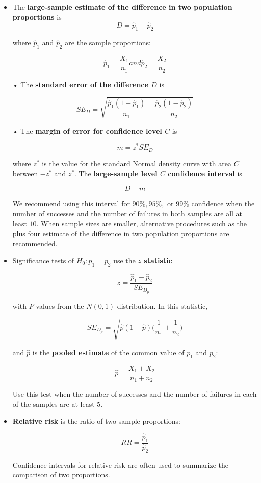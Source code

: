 		\begin{itemize}
			\item The \textbf{large-sample estimate of the difference in two population proportions} is
			\[D=\hat{p}_1-\hat{p}_2\]
			
			where $\hat{p}_1$ and $\hat{p}_2$ are the sample proportions:
			
			\[\hat{p}_1=\frac{X_1}{n_1} and \hat{p}_2=\frac{X_2}{n_2}\]
			
			• The \textbf{standard error of the difference $D$} is
			
			\[SE_D=    \sqrt{\frac{\hat{p}_1(1-\hat{p}_1)}{n_1}+\frac{\hat{p}_2(1-\hat{p}_2)}{n_2}}\]
			
			• The \textbf{margin of error for confidence level $C$} is
			
			\[m=z^{*}SE_D\]
			
			where $z^{*}$ is the value for the standard Normal density curve with area $C$ between $-z^{*}$ and $z^{*}$. The \textbf{large-sample level $C$ confidence interval} is
			
			\[D \pm m\]
			
			We recommend using this interval for $90\%, 95\%,$ or $99\%$ confidence when the number of successes and the number of failures in both samples are all at least $10$. When sample sizes are smaller, alternative procedures such as the plus four estimate of the difference in two population proportions are recommended.
			
			\item Significance tests of $H_0: p_1 = p_2$ use the \textbf{$z$ statistic}
			
			\[z=\frac{\hat{p}_1-\hat{p}_2}{SE_{D_p}}\]
			
			with $P$-values from the $N(0, 1)$ distribution. In this statistic,
			
			\[SE_{D_p}= \sqrt{\hat{p}(1-\hat{p})\Big(\frac{1}{n_1}+\frac{1}{n_2}\Big)}\]
			
			and $\hat{p}$ is the \textbf{pooled estimate} of the common value of $p_1$ and $p_2$:
			
			\[\hat{p}=\frac{X_1+X_2}{n_1+n_2}\]
			
			Use this test when the number of successes and the number of failures in each of the samples are at least $5$.
			
			\item \textbf{Relative risk} is the ratio of two sample proportions:
			
			\[RR=\frac{\hat{p}_1}{\hat{p}_2}\]
			
			Confidence intervals for relative risk are often used to summarize the comparison of two proportions.
		\end{itemize}